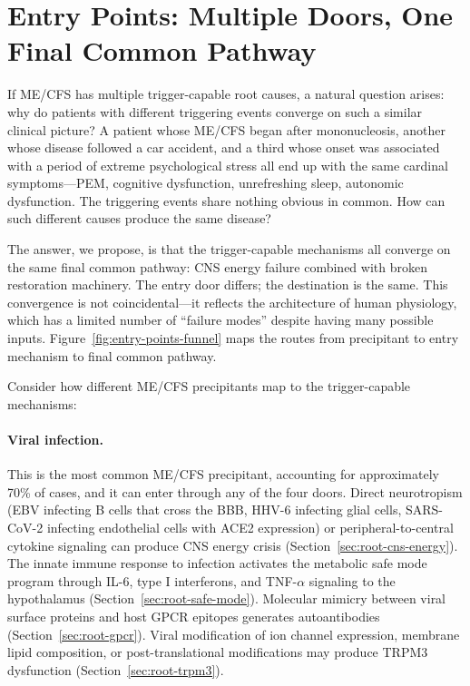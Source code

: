 
\section{Entry Points: Multiple Doors, One Final Common Pathway}
\label{sec:entry-points}

If ME/CFS has multiple trigger-capable root causes, a natural question arises: why do patients with different triggering events converge on such a similar clinical picture? A patient whose ME/CFS began after mononucleosis, another whose disease followed a car accident, and a third whose onset was associated with a period of extreme psychological stress all end up with the same cardinal symptoms---PEM, cognitive dysfunction, unrefreshing sleep, autonomic dysfunction. The triggering events share nothing obvious in common. How can such different causes produce the same disease?

The answer, we propose, is that the trigger-capable mechanisms all converge on the same final common pathway: CNS energy failure combined with broken restoration machinery. The entry door differs; the destination is the same. This convergence is not coincidental---it reflects the architecture of human physiology, which has a limited number of ``failure modes'' despite having many possible inputs. Figure~\ref{fig:entry-points-funnel} maps the routes from precipitant to entry mechanism to final common pathway.

Consider how different ME/CFS precipitants map to the trigger-capable mechanisms:

\paragraph{Viral infection.} This is the most common ME/CFS precipitant, accounting for approximately 70\% of cases, and it can enter through any of the four doors. Direct neurotropism (EBV infecting B cells that cross the BBB, HHV-6 infecting glial cells, SARS-CoV-2 infecting endothelial cells with ACE2 expression) or peripheral-to-central cytokine signaling can produce CNS energy crisis (Section~\ref{sec:root-cns-energy}). The innate immune response to infection activates the metabolic safe mode program through IL-6, type I interferons, and TNF-$\alpha$ signaling to the hypothalamus (Section~\ref{sec:root-safe-mode}). Molecular mimicry between viral surface proteins and host GPCR epitopes generates autoantibodies (Section~\ref{sec:root-gpcr}). Viral modification of ion channel expression, membrane lipid composition, or post-translational modifications may produce TRPM3 dysfunction (Section~\ref{sec:root-trpm3}).

